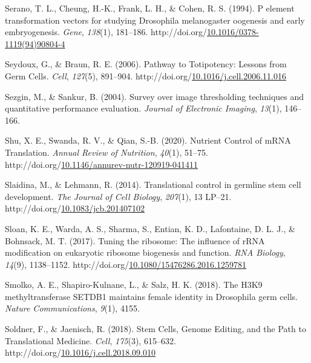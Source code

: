 \documentclass[12pt,oneside]{reedthesis}
\newlength{\cslhangindent}
\newenvironment{CSLReferences}[2] %
 {%
  \setlength{\parindent}{0pt}
  \ifodd #1 \everypar{\setlength{\hangindent}{\cslhangindent}}\ignorespaces\fi
  \ifnum #2 > 0
  \setlength{\parskip}{#2\baselineskip}
  \fi
 }%
 {}
\begin{document}
\begin{CSLReferences}{1}{0}
\leavevmode{}%
Serano, T. L., Cheung, H.-K., Frank, L. H., \& Cohen, R. S. (1994). P element transformation vectors for studying {Drosophila} melanogaster oogenesis and early embryogenesis. \emph{Gene}, \emph{138}(1), 181--186. http://doi.org/\href{https://doi.org/10.1016/0378-1119(94)90804-4}{10.1016/0378-1119(94)90804-4}

\leavevmode{}%
Seydoux, G., \& Braun, R. E. (2006). Pathway to {Totipotency}: {Lessons} from {Germ Cells}. \emph{Cell}, \emph{127}(5), 891--904. http://doi.org/\href{https://doi.org/10.1016/j.cell.2006.11.016}{10.1016/j.cell.2006.11.016}

\leavevmode{}%
Sezgin, M., \& Sankur, B. (2004). Survey over image thresholding techniques and quantitative performance evaluation. \emph{Journal of Electronic Imaging}, \emph{13}(1), 146--166.

\leavevmode{}%
Shu, X. E., Swanda, R. V., \& Qian, S.-B. (2020). Nutrient {Control} of {mRNA Translation}. \emph{Annual Review of Nutrition}, \emph{40}(1), 51--75. http://doi.org/\href{https://doi.org/10.1146/annurev-nutr-120919-041411}{10.1146/annurev-nutr-120919-041411}

\leavevmode{}%
Slaidina, M., \& Lehmann, R. (2014). Translational control in germline stem cell development. \emph{The Journal of Cell Biology}, \emph{207}(1), 13 LP--21. http://doi.org/\href{https://doi.org/10.1083/jcb.201407102}{10.1083/jcb.201407102}

\leavevmode{}%
Sloan, K. E., Warda, A. S., Sharma, S., Entian, K. D., Lafontaine, D. L. J., \& Bohnsack, M. T. (2017). Tuning the ribosome: {The} influence of {rRNA} modification on eukaryotic ribosome biogenesis and function. \emph{RNA Biology}, \emph{14}(9), 1138--1152. http://doi.org/\href{https://doi.org/10.1080/15476286.2016.1259781}{10.1080/15476286.2016.1259781}

\leavevmode{}%
Smolko, A. E., Shapiro-Kulnane, L., \& Salz, H. K. (2018). The {H3K9} methyltransferase {SETDB1} maintains female identity in {Drosophila} germ cells. \emph{Nature Communications}, \emph{9}(1), 4155.

\leavevmode{}%
Soldner, F., \& Jaenisch, R. (2018). Stem {Cells}, {Genome Editing}, and the {Path} to {Translational Medicine}. \emph{Cell}, \emph{175}(3), 615--632. http://doi.org/\href{https://doi.org/10.1016/j.cell.2018.09.010}{10.1016/j.cell.2018.09.010}


\end{CSLReferences}
\end{document}
